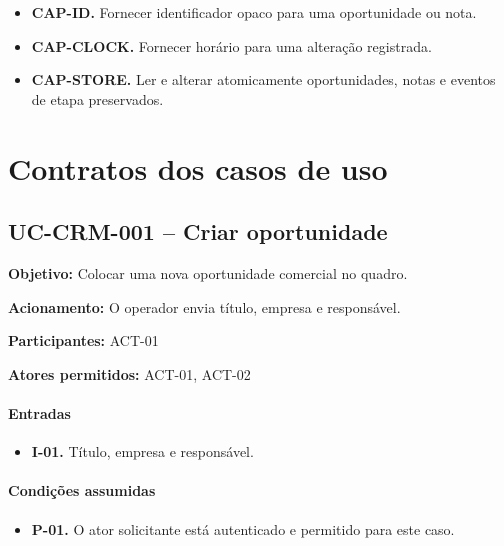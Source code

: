 \documentclass[10pt,a4paper]{article}
\begin{document}
\begin{itemize}

\item \textbf{CAP-ID.} Fornecer identificador opaco para uma oportunidade ou nota.

\item \textbf{CAP-CLOCK.} Fornecer horário para uma alteração registrada.

\item \textbf{CAP-STORE.} Ler e alterar atomicamente oportunidades, notas e eventos de etapa preservados.

\end{itemize}

\section{Contratos dos casos de uso}

\subsection{UC-CRM-001 -- Criar oportunidade}

\textbf{Objetivo:} Colocar uma nova oportunidade comercial no quadro.

\textbf{Acionamento:} O operador envia título, empresa e responsável.

\textbf{Participantes:} ACT-01

\textbf{Atores permitidos:} ACT-01, ACT-02

\paragraph{Entradas}

\begin{itemize}

\item \textbf{I-01.} Título, empresa e responsável.

\end{itemize}

\paragraph{Condições assumidas}

\begin{itemize}

\item \textbf{P-01.} O ator solicitante está autenticado e permitido para este caso.

\end{itemize}
\end{document}
